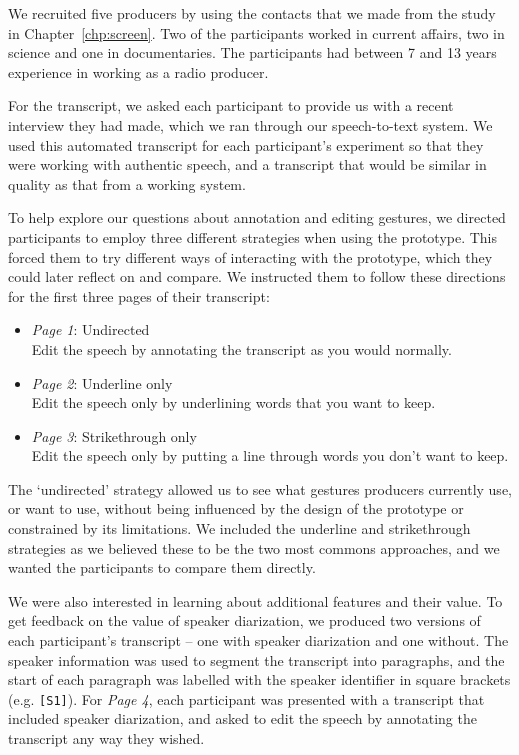 We recruited five producers by using the contacts that we made from the study in Chapter~\ref{chp:screen}. Two of the
participants worked in current affairs, two in science and one in documentaries.  The participants had between 7 and 13
years experience in working as a radio producer.

For the transcript, we asked each participant to provide us with a recent interview they had made, which we ran through
our speech-to-text system. We used this automated transcript for each participant's experiment so that they were
working with authentic speech, and a transcript that would be similar in quality as that from a working system.

To help explore our questions about annotation and editing gestures, we directed participants to employ three different
strategies when using the prototype. This forced them to try different ways of interacting with the prototype,
which they could later reflect on and compare. We instructed them to follow these directions for the first three
pages of their transcript: 

\begin{itemize}
  \item \textit{Page 1}: Undirected\\Edit the speech by annotating the transcript as you would normally.
  \item \textit{Page 2}: Underline only\\Edit the speech only by underlining words that you want to keep.
  \item \textit{Page 3}: Strikethrough only\\Edit the speech only by putting a line through words you don't want to keep.
\end{itemize}

The `undirected' strategy allowed us to see what gestures producers currently use, or want to use, without being
influenced by the design of the prototype or constrained by its limitations. We included the underline and
strikethrough strategies as we believed these to be the two most commons approaches, and we wanted the participants to
compare them directly.

We were also interested in learning about additional features and their value. To get feedback on the value of speaker
diarization, we produced two versions of each participant's transcript -- one with speaker diarization and one without.
The speaker information was used to segment the transcript into paragraphs, and the start of each paragraph was
labelled with the speaker identifier in square brackets (e.g.  \texttt{{[}S1{]}}).  For \textit{Page 4}, each
participant was presented with a transcript that included speaker diarization, and asked to edit the speech by
annotating the transcript any way they wished.


